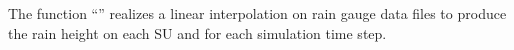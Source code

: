 The function ``\englishname'' realizes a linear interpolation on rain gauge data files to produce the rain height on each SU and for each simulation time step.
